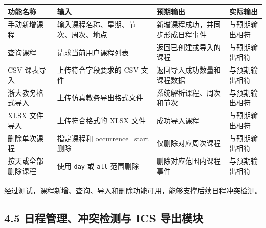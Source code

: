 {\def\LTcaptype{none} %
\begin{longtable}[]{@{}|
  >{\raggedright\arraybackslash}p{}|
  >{\raggedright\arraybackslash}p{}|
  >{\raggedright\arraybackslash}p{}|
  >{\raggedright\arraybackslash}p{}|@{}}
\hline
\rowcolor{gray!12}
\begin{minipage}[b]{\linewidth}\raggedright
\bfseries 功能名称
\end{minipage} & \begin{minipage}[b]{\linewidth}\raggedright
\bfseries 输入
\end{minipage} & \begin{minipage}[b]{\linewidth}\raggedright
\bfseries 预期输出
\end{minipage} & \begin{minipage}[b]{\linewidth}\raggedright
\bfseries 实际输出
\end{minipage} \\
\hline
\endhead
\hline
\endlastfoot
手动新增课程 & 输入课程名称、星期、节次、周次、地点 &
新增课程成功，并同步形成日程事件 & 与预期输出相符 \\
\hline
查询课程 & 请求当前用户课程列表 & 返回已创建或导入的课程 &
与预期输出相符 \\
\hline
CSV 课表导入 & 上传符合字段要求的 CSV 文件 & 返回导入成功数量和课程数据
& 与预期输出相符 \\
\hline
浙大教务格式导入 & 上传仿真教务导出格式文件 & 系统解析课程、周次和节次 &
与预期输出相符 \\
\hline
XLSX 文件导入 & 上传符合格式的 XLSX 文件 & 成功导入课程 &
与预期输出相符 \\
\hline
删除单次课程 & 指定课程和 occurrence\_start 删除 & 仅删除对应周次课程 &
与预期输出相符 \\
\hline
按天或全部删除课程 & 使用 \passthrough{\lstinline!day!} 或
\passthrough{\lstinline!all!} 范围删除 & 删除对应范围内课程事件 &
与预期输出相符 \\
\hline
\end{longtable}
}

经过测试，课程新增、查询、导入和删除功能可用，能够支撑后续日程冲突检测。

\subsection{4.5 日程管理、冲突检测与 ICS
导出模块}\label{ux65e5ux7a0bux7ba1ux7406ux51b2ux7a81ux68c0ux6d4bux4e0e-ics-ux5bfcux51faux6a21ux5757}

